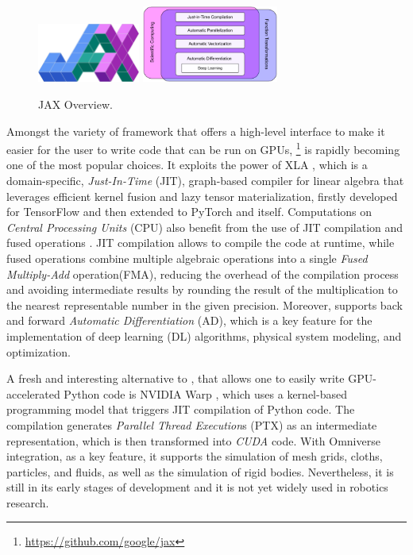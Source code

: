 \begin{figure}
    \centering
    \caption{JAX Overview.}
    \label{fig:jax_logo}
    \includegraphics[width=0.3\textwidth]{Images/jax_logo.png} \qquad \qquad
    \includegraphics[width=0.4\textwidth]{Images/JAX-overview.png}
\end{figure}

Amongst the variety of framework that offers a high-level interface to make it easier for the user to write code that can be run on \ac{GPU}s, \jax \footnote{\url{https://github.com/google/jax}} \citep{bradbury_jax_2018,47008} is rapidly becoming one of the most popular choices. It exploits the power of \ac{XLA} \citep{50530}, which is a domain-specific, \textit{Just-In-Time} (\ac{JIT}), graph-based compiler for linear algebra that leverages efficient kernel fusion and lazy tensor materialization, firstly developed for TensorFlow \citep{tensorflow2015-whitepaper} and then extended to PyTorch and \jax itself.
Computations on \textit{Central Processing Units} (\ac{CPU}) also benefit from the use of \ac{JIT} compilation and fused operations \citep{wang_kernel_2010,snider_operator_2023}. \ac{JIT} compilation allows to compile the code at runtime, while fused operations combine multiple algebraic operations into a single \textit{Fused Multiply-Add} operation(\ac{FMA}), reducing the overhead of the compilation process and avoiding intermediate results by rounding the result of the multiplication to the nearest representable number in the given precision.
Moreover, \jax supports back and forward \textit{Automatic Differentiation} (\ac{AD}), which is a key feature for the implementation of deep learning (DL) algorithms, physical system modeling, and optimization.

A fresh and interesting alternative to \jax, that allows one to easily write \ac{GPU}-accelerated Python code is NVIDIA Warp \citep{warp2022}, which uses a kernel-based programming model that triggers \ac{JIT} compilation of Python code. The compilation generates \textit{Parallel Thread Execution}s (\ac{PTX}) as an intermediate representation, which is then transformed into \textit{CUDA} code. With Omniverse integration, as a key feature, it supports the simulation of mesh grids, cloths, particles, and fluids, as well as the simulation of rigid bodies. Nevertheless, it is still in its early stages of development and it is not yet widely used in robotics research.



